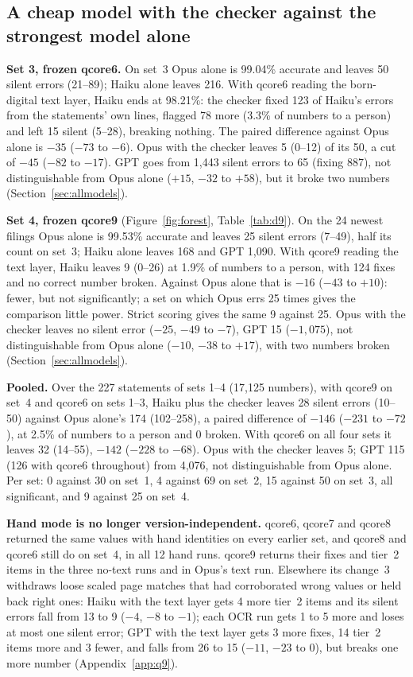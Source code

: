 \documentclass[10pt,twocolumn]{article}
\newcommand{\vq}[1]{\textsf{qcore#1}}
\begin{document}


\subsection{A cheap model with the checker against the strongest model alone}\label{sec:headline}
\textbf{Set 3, frozen \vq{6}.} On set~3 Opus alone is 99.04\% accurate and leaves 50 silent errors (21--89); Haiku alone leaves 216. With \vq{6} reading the born-digital text layer, Haiku ends at 98.21\%: the checker fixed 123 of Haiku's errors from the statements' own lines, flagged 78 more (3.3\% of numbers to a person) and left 15 silent (5--28), breaking nothing. The paired difference against Opus alone is $-35$ ($-73$ to $-6$). Opus with the checker leaves 5 (0--12) of its 50, a cut of $-45$ ($-82$ to $-17$). GPT goes from 1,443 silent errors to 65 (fixing 887), not distinguishable from Opus alone ($+15$, $-32$ to $+58$), but it broke two numbers (Section~\ref{sec:allmodels}).

\textbf{Set 4, frozen \vq{9}} (Figure~\ref{fig:forest}, Table~\ref{tab:d9}). On the 24 newest filings Opus alone is 99.53\% accurate and leaves 25 silent errors (7--49), half its count on set~3; Haiku alone leaves 168 and GPT 1,090. With \vq{9} reading the text layer, Haiku leaves 9 (0--26) at 1.9\% of numbers to a person, with 124 fixes and no correct number broken. Against Opus alone that is $-16$ ($-43$ to $+10$): fewer, but not significantly; a set on which Opus errs 25 times gives the comparison little power. Strict scoring gives the same 9 against 25. Opus with the checker leaves no silent error ($-25$, $-49$ to $-7$), GPT 15 ($-1{,}075$), not distinguishable from Opus alone ($-10$, $-38$ to $+17$), with two numbers broken (Section~\ref{sec:allmodels}).

\textbf{Pooled.} Over the 227 statements of sets 1--4 (17,125 numbers), with \vq{9} on set~4 and \vq{6} on sets 1--3, Haiku plus the checker leaves 28 silent errors (10--50) against Opus alone's 174 (102--258), a paired difference of $-146$ ($-231$ to $-72$), at 2.5\% of numbers to a person and 0 broken. With \vq{6} on all four sets it leaves 32 (14--55), $-142$ ($-228$ to $-68$). Opus with the checker leaves 5; GPT 115 (126 with \vq{6} throughout) from 4,076, not distinguishable from Opus alone. Per set: 0 against 30 on set~1, 4 against 69 on set~2, 15 against 50 on set~3, all significant, and 9 against 25 on set~4.

\textbf{Hand mode is no longer version-independent.} \vq{6}, \vq{7} and \vq{8} returned the same values with hand identities on every earlier set, and \vq{8} and \vq{6} still do on set~4, in all 12 hand runs. \vq{9} returns their fixes and tier~2 items in the three no-text runs and in Opus's text run. Elsewhere its change~3 withdraws loose scaled page matches that had corroborated wrong values or held back right ones: Haiku with the text layer gets 4 more tier~2 items and its silent errors fall from 13 to 9 ($-4$, $-8$ to $-1$); each OCR run gets 1 to 5 more and loses at most one silent error; GPT with the text layer gets 3 more fixes, 14 tier~2 items more and 3 fewer, and falls from 26 to 15 ($-11$, $-23$ to 0), but breaks one more number (Appendix~\ref{app:q9}).
\end{document}
